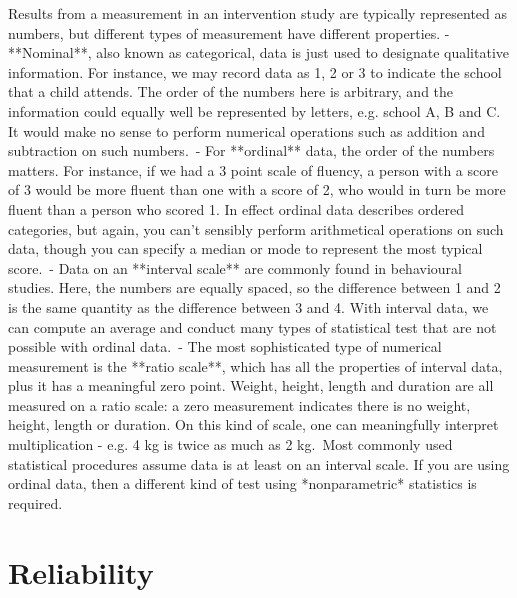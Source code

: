 \documentclass{krantz}
\begin{document}
\begin{tcolorbox}[colback=Black!5!lightgray,colframe=black!75!black,coltitle=white,title=Types of numerical measurement]\label{box:numerical}

Results from a measurement in an intervention study are typically represented as numbers, but different types of measurement have different properties. - **Nominal**, also known as categorical, data is just used to designate qualitative information. For instance, we may record data as 1, 2 or 3 to indicate the school that a child attends. The order of the numbers here is arbitrary, and the information could equally well be represented by letters, e.g. school A, B and C. It would make no sense to perform numerical operations such as addition and subtraction on such numbers.\
- For **ordinal** data, the order of the numbers matters. For instance, if we had a 3 point scale of fluency, a person with a score of 3 would be more fluent than one with a score of 2, who would in turn be more fluent than a person who scored 1. In effect ordinal data describes ordered categories, but again, you can't sensibly perform arithmetical operations on such data, though you can specify a median or mode to represent the most typical score.\
- Data on an **interval scale** are commonly found in behavioural studies. Here, the numbers are equally spaced, so the difference between 1 and 2 is the same quantity as the difference between 3 and 4. With interval data, we can compute an average and conduct many types of statistical test that are not possible with ordinal data.\
- The most sophisticated type of numerical measurement is the **ratio scale**, which has all the properties of interval data, plus it has a meaningful zero point. Weight, height, length and duration are all measured on a ratio scale: a zero measurement indicates there is no weight, height, length or duration. On this kind of scale, one can meaningfully interpret multiplication - e.g. 4 kg is twice as much as 2 kg.\
Most commonly used statistical procedures assume data is at least on an interval scale. If you are using ordinal data, then a different kind of test using *nonparametric* statistics is required.
\end{tcolorbox}


\hypertarget{reliability-1}{%
\section{Reliability}\label{reliability-1}}
\end{document}
